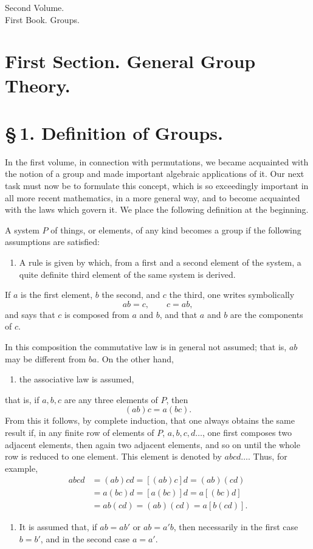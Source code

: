 \documentclass[11pt]{article}
\begin{document}
\begin{center}{\large Second Volume.}\\[0.4em]{\Large First Book. Groups.}\\[0.4em]\end{center}

\section*{First Section. General Group Theory.}

\section*{\S\,1. Definition of Groups.}

In the first volume, in connection with permutations, we became acquainted with the notion of a group and made important algebraic applications of it. Our next task must now be to formulate this concept, which is so exceedingly important in all more recent mathematics, in a more general way, and to become acquainted with the laws which govern it. We place the following definition at the beginning.

A system $P$ of things, or elements, of any kind becomes a group if the following assumptions are satisfied:

\begin{enumerate}[label=\arabic*.]
\item A rule is given by which, from a first and a second element of the system, a quite definite third element of the same system is derived.
\end{enumerate}
If $a$ is the first element, $b$ the second, and $c$ the third, one writes symbolically
\[
ab=c,\qquad c=ab,
\]
and says that $c$ is composed from $a$ and $b$, and that $a$ and $b$ are the components of $c$.

In this composition the commutative law is in general not assumed; that is, $ab$ may be different from $ba$. On the other hand,
\begin{enumerate}[resume,label=\arabic*.]
\item the associative law is assumed,
\end{enumerate}
that is, if $a,b,c$ are any three elements of $P$, then
\[
(ab)c=a(bc).
\]
From this it follows, by complete induction, that one always obtains the same result if, in any finite row of elements of $P$, $a,b,c,d\ldots$, one first composes two adjacent elements, then again two adjacent elements, and so on until the whole row is reduced to one element. This element is denoted by $abcd\ldots$. Thus, for example,
\[
\begin{aligned}
abcd&=(ab)cd=[(ab)c]d=(ab)(cd)\\
&=a(bc)d=[a(bc)]d=a[(bc)d]\\
&=ab(cd)=(ab)(cd)=a[b(cd)].
\end{aligned}
\]
\begin{enumerate}[resume,label=\arabic*.]
\item It is assumed that, if $ab=ab'$ or $ab=a'b$, then necessarily in the first case $b=b'$, and in the second case $a=a'$.
\end{enumerate}
\end{document}
